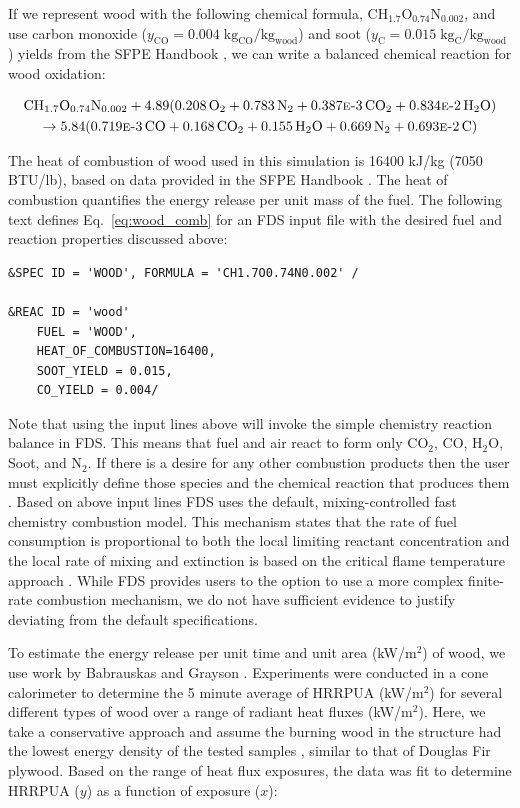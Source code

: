 \documentclass[11pt,oneside]{book}
\renewcommand{\C}{\mbox{C}}
\renewcommand{\H}{\mbox{H}}
\renewcommand{\O}{\mbox{O}}
\newcommand{\N}{\mbox{N}}
\begin{document}
If we represent wood with the following chemical formula, $\C\H_{1.7}\O_{0.74}\N_{0.002}$, and use carbon monoxide ($y_{\mathrm{CO}}=0.004 \; {\mathrm{kg_{CO}}/\mathrm{kg_{wood}}}$) and soot ($y_{\mathrm{C}}=0.015 \; {\mathrm{kg_{C}}/\mathrm{kg_{wood}}}$) yields from the SFPE Handbook \cite{SFPE:Tewarson}, we can write a balanced chemical reaction for wood oxidation:

\begin{multline}
\C\H_{1.7}\O_{0.74}\N_{0.002} + 4.89(0.208\,\O_{2} + 0.783\,\N_{2} + 0.387\text{\sc{e}-}3\,\C\O_{2} + 0.834\text{\sc{e}-}2\,\H_{2}\O) \\ 
\rightarrow 5.84(0.719\text{\sc{e}-}3\,\C\O + 0.168\,\C\O_{2} + 0.155\,\H_{2}\O + 0.669\,\N_{2} + 0.693\text{\sc{e}-}2\,\C)
\label{eq:wood_comb}
\end{multline}

The heat of combustion of wood used in this simulation is 16400 kJ/kg (7050 BTU/lb), based on data provided in the SFPE Handbook \cite{SFPE:Tewarson}. The heat of combustion quantifies the energy release per unit mass of the fuel. The following text defines Eq.~\ref{eq:wood_comb} for an FDS input file with the desired fuel and reaction properties discussed above:

\begin{lstlisting}
&SPEC ID = 'WOOD', FORMULA = 'CH1.7O0.74N0.002' /

&REAC ID = 'wood' 
    FUEL = 'WOOD', 
    HEAT_OF_COMBUSTION=16400,
    SOOT_YIELD = 0.015,
    CO_YIELD = 0.004/
\end{lstlisting}

Note that using the input lines above will invoke the simple chemistry reaction balance in FDS. This means that fuel and air react to form only CO$_2$, CO, H$_2$O, Soot, and N$_2$. If there is a desire for any other combustion products then the user must explicitly define those species and the chemical reaction that produces them \cite{FDS_Users_Guide}. Based on above input lines FDS uses the default, mixing-controlled fast chemistry combustion model. This mechanism  states that the rate of fuel consumption is proportional to both the local limiting reactant concentration and the local rate of mixing and extinction is based on the critical flame temperature approach \cite{FDS_Math_Guide}. While FDS provides users to the option to use a more complex finite-rate combustion mechanism, we do not have sufficient evidence to justify deviating from the default specifications. 

To estimate the energy release per unit time and unit area (kW/m$^2$) of wood, we use work by Babrauskas and Grayson \cite{babrauskas1990}. Experiments were conducted in a cone calorimeter to determine the 5 minute average of HRRPUA (kW/m$^2$) for several different types of wood over a range of radiant heat fluxes (kW/m$^2$). Here, we take a conservative approach and assume the burning wood in the structure had the lowest energy density of the tested samples \cite{babrauskas1990}, similar to that of Douglas Fir plywood. Based on the range of heat flux exposures, the data was fit to determine HRRPUA ($y$) as a function of exposure ($x$):
\end{document}
